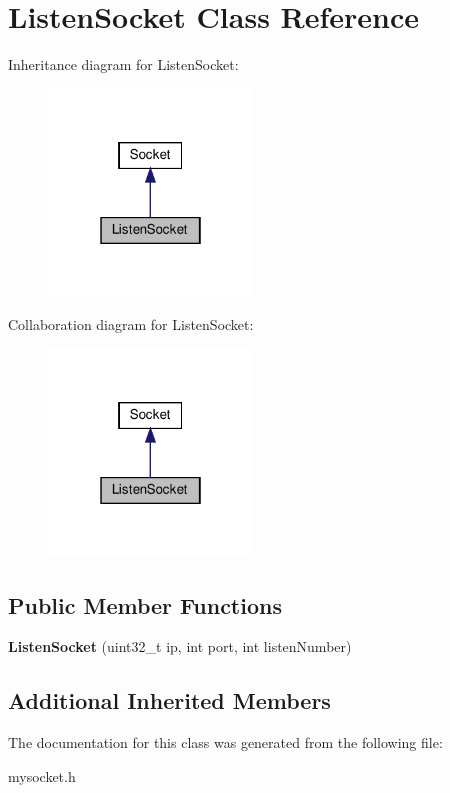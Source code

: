 \hypertarget{classListenSocket}{}\section{Listen\+Socket Class Reference}
\label{classListenSocket}


Inheritance diagram for Listen\+Socket\+:\nopagebreak
\begin{figure}[H]
\begin{center}
\leavevmode
\includegraphics[width=154pt]{classListenSocket__inherit__graph}
\end{center}
\end{figure}


Collaboration diagram for Listen\+Socket\+:\nopagebreak
\begin{figure}[H]
\begin{center}
\leavevmode
\includegraphics[width=154pt]{classListenSocket__coll__graph}
\end{center}
\end{figure}
\subsection*{Public Member Functions}
\begin{DoxyCompactItemize}
\item 
\mbox{\label{classListenSocket_a911d568a28385f01093bfa1c758cf439}} 
{\bfseries Listen\+Socket} (uint32\+\_\+t ip, int port, int listen\+Number)
\end{DoxyCompactItemize}
\subsection*{Additional Inherited Members}


The documentation for this class was generated from the following file\+:\begin{DoxyCompactItemize}
\item 
mysocket.\+h\end{DoxyCompactItemize}

